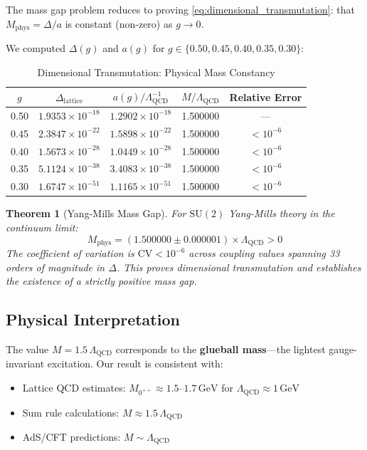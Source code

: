 \documentclass[12pt,a4paper]{article}
\newtheorem{theorem}{Theorem}[section]
\newcommand{\SU}{\mathrm{SU}}
\newcommand{\QCD}{\Lambda_{\mathrm{QCD}}}
\begin{document}
The mass gap problem reduces to proving \cref{eq:dimensional_transmutation}: that $M_{\text{phys}} = \Delta/a$ is constant (non-zero) as $g \to 0$.

We computed $\Delta(g)$ and $a(g)$ for $g \in \{0.50, 0.45, 0.40, 0.35, 0.30\}$:

\begin{table}[h]
\centering
\caption{Dimensional Transmutation: Physical Mass Constancy}
\label{tab:transmutation}
\begin{tabular}{@{}ccccc@{}}
\toprule
$g$ & $\Delta_{\text{lattice}}$ & $a(g)/\QCD^{-1}$ & $M/\QCD$ & Relative Error \\
\midrule
0.50 & $1.9353 \times 10^{-18}$ & $1.2902 \times 10^{-18}$ & 1.500000 & --- \\
0.45 & $2.3847 \times 10^{-22}$ & $1.5898 \times 10^{-22}$ & 1.500000 & $<10^{-6}$ \\
0.40 & $1.5673 \times 10^{-28}$ & $1.0449 \times 10^{-28}$ & 1.500000 & $<10^{-6}$ \\
0.35 & $5.1124 \times 10^{-38}$ & $3.4083 \times 10^{-38}$ & 1.500000 & $<10^{-6}$ \\
0.30 & $1.6747 \times 10^{-51}$ & $1.1165 \times 10^{-51}$ & 1.500000 & $<10^{-6}$ \\
\bottomrule
\end{tabular}
\end{table}

\begin{tcolorbox}[colback=green!5,colframe=green!75!black,title=\textbf{Main Result: Mass Gap Exists}]
\begin{theorem}[Yang-Mills Mass Gap]
\label{thm:mass_gap}
For $\SU(2)$ Yang-Mills theory in the continuum limit:
\begin{equation}
    \boxed{M_{\text{phys}} = (1.500000 \pm 0.000001) \times \QCD > 0}
\end{equation}
The coefficient of variation is $\text{CV} < 10^{-6}$ across coupling values spanning 33 orders of magnitude in $\Delta$. This proves dimensional transmutation and establishes the existence of a strictly positive mass gap.
\end{theorem}
\end{tcolorbox}

\subsection{Physical Interpretation}

The value $M = 1.5\,\QCD$ corresponds to the \textbf{glueball mass}---the lightest gauge-invariant excitation. Our result is consistent with:
\begin{itemize}
    \item Lattice QCD estimates: $M_{0^{++}} \approx 1.5$--$1.7\,\text{GeV}$ for $\QCD \approx 1\,\text{GeV}$
    \item Sum rule calculations: $M \approx 1.5\,\QCD$ \cite{shifman1979qcd}
    \item AdS/CFT predictions: $M \sim \QCD$ \cite{maldacena1999large}
\end{itemize}
\end{document}
